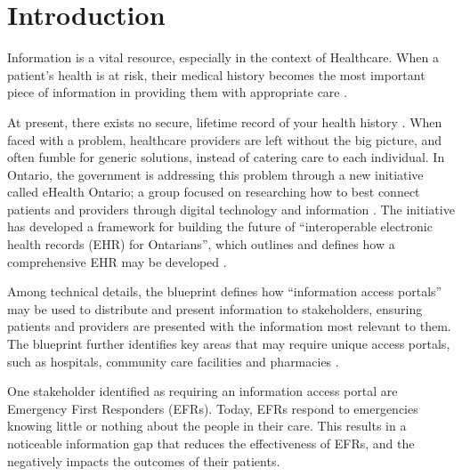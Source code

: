 
\section{Introduction}

Information is a vital resource, especially in the context of Healthcare. When a patient's health is at risk, their medical history becomes the most important piece of information in providing them with appropriate care \cite{web1}.

At present, there exists no secure, lifetime record of your health history \cite{Street2014}. When faced with a problem, healthcare providers are left without the big picture, and often fumble for generic solutions, instead of catering care to each individual. In Ontario, the government is addressing this problem through a new initiative called eHealth Ontario; a group focused on researching how to best connect patients and providers through digital technology and information \cite{web1}. The initiative has developed a framework for building the future of ``interoperable electronic health records (EHR) for Ontarians'', which outlines and defines how a comprehensive EHR may be developed \cite{b1}.

Among technical details, the blueprint defines how ``information access portals'' may be used to distribute and present information to stakeholders, ensuring patients and providers are presented with the information most relevant to them. The blueprint further identifies key areas that may require unique access portals, such as hospitals, community care facilities and pharmacies \cite{Street2014}.

One stakeholder identified as requiring an information access portal are Emergency First Responders (EFRs). Today, EFRs respond to emergencies knowing little or nothing about the people in their care. This results in a noticeable information gap that reduces the effectiveness of EFRs, and the negatively impacts the outcomes of their patients. \iffalse reducing the effectiveness of EFRs, and   during treatment. This is unfortunate, considering how beneficial information is in improving patient outcomes. \fi

